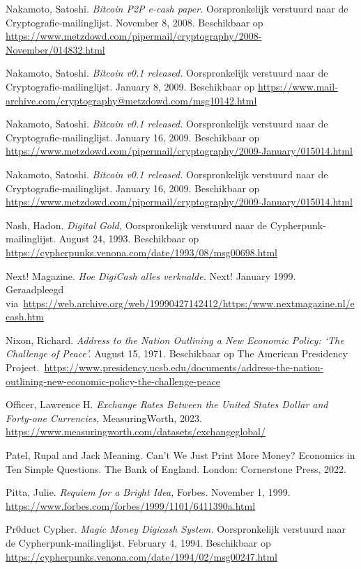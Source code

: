 \documentclass[
  a5paper,
  smalldemyvopaper,11pt,twoside,onecolumn,openright,extrafontsizes,
hidelinks]{memoir}
\begin{document}
Nakamoto, Satoshi. \emph{Bitcoin P2P e-cash paper.} Oorspronkelijk
verstuurd naar de Cryptografie-mailinglijst. November 8, 2008.
Beschikbaar op
\url{https://www.metzdowd.com/pipermail/cryptography/2008-November/014832.html}

Nakamoto, Satoshi. \emph{Bitcoin v0.1 released.} Oorspronkelijk
verstuurd naar de Cryptografie-mailinglijst. January 8, 2009.
Beschikbaar op
\url{https://www.mail-archive.com/cryptography@metzdowd.com/msg10142.html}

Nakamoto, Satoshi. \emph{Bitcoin v0.1 released.} Oorspronkelijk
verstuurd naar de Cryptografie-mailinglijst. January 16, 2009.
Beschikbaar op
\url{https://www.metzdowd.com/pipermail/cryptography/2009-January/015014.html}

Nakamoto, Satoshi. \emph{Bitcoin v0.1 released.} Oorspronkelijk
verstuurd naar de Cryptografie-mailinglijst. January 16, 2009.
Beschikbaar op
\url{https://www.metzdowd.com/pipermail/cryptography/2009-January/015014.html}

Nash, Hadon. \emph{Digital Gold,} Oorspronkelijk verstuurd naar de
Cypherpunk-mailinglijst. August 24, 1993. Beschikbaar op
\url{https://cypherpunks.venona.com/date/1993/08/msg00698.html}

Next! Magazine. \emph{Hoe DigiCash alles verknalde.} Next! January 1999.
Geraadpleegd
via~\url{https://web.archive.org/web/19990427142412/https:/www.nextmagazine.nl/ecash.htm}

Nixon, Richard. \emph{Address to the Nation Outlining a New Economic
Policy: `The Challenge of Peace'.} August 15, 1971. Beschikbaar op The
American Presidency
Project.~\url{https://www.presidency.ucsb.edu/documents/address-the-nation-outlining-new-economic-policy-the-challenge-peace}

Officer, Lawrence H. \emph{Exchange Rates Between the United States
Dollar and Forty-one Currencies,} MeasuringWorth, 2023.
\url{https://www.measuringworth.com/datasets/exchangeglobal/}

Patel, Rupal and Jack Meaning. Can't We Just Print More Money? Economics
in Ten Simple Questions. The Bank of England. London: Cornerstone Press,
2022.

Pitta, Julie. \emph{Requiem for a Bright Idea,} Forbes. November 1,
1999. \url{https://www.forbes.com/forbes/1999/1101/6411390a.html}

Pr0duct Cypher. \emph{Magic Money Digicash System.} Oorspronkelijk
verstuurd naar de Cypherpunk-mailinglijst. February 4, 1994. Beschikbaar
op \url{https://cypherpunks.venona.com/date/1994/02/msg00247.html}
\end{document}
